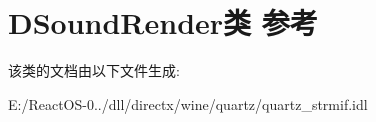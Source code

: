 \hypertarget{class_d_sound_render}{}\section{D\+Sound\+Render类 参考}
\label{class_d_sound_render}


该类的文档由以下文件生成\+:\begin{DoxyCompactItemize}
\item 
E\+:/\+React\+O\+S-\/0../dll/directx/wine/quartz/quartz\+\_\+strmif.\+idl\end{DoxyCompactItemize}
